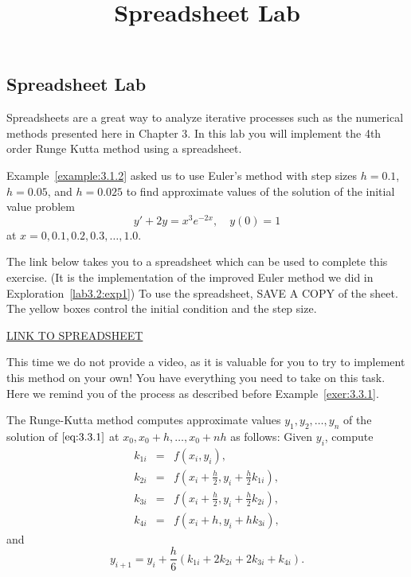 \documentclass{ximera}
\title{Spreadsheet Lab} \license{CC BY-NC-SA 4.0}
\begin{document}
\begin{abstract}
\end{abstract}
\maketitle

\begin{onlineOnly}
\section*{Spreadsheet Lab}
\end{onlineOnly}
 
Spreadsheets are a great way to analyze iterative processes such as the numerical methods presented here in Chapter 3.  In this lab you will implement the 4th order Runge Kutta method using a spreadsheet.
 
 
\begin{exploration}\label{lab3.3:exp1}
Example~\ref{example:3.1.2} asked us to use Euler's method with step sizes $h=0.1$, $h=0.05$, and $h=0.025$ to
find approximate values of the solution of the initial value problem
$$
y'+2y=x^3e^{-2x},\quad y(0)=1
$$
at $x=0, 0.1, 0.2, 0.3, \ldots, 1.0$.
 
The link below takes you to a spreadsheet which can be used to complete this exercise.  (It is the implementation of the improved Euler method we did in Exploration~\ref{lab3.2:exp1})  To use the spreadsheet, SAVE A COPY of the sheet.  The yellow boxes control the initial condition and the step size. 
     
\href{https://docs.google.com/spreadsheets/d/1UZyfR-vJ-ALm6GqvgHudH_0z-KIjuA2OZvAzZBKa4hc/edit?usp=sharing}{LINK TO SPREADSHEET}

This time we do not provide a video, as it is valuable for you to try to implement this method on your own!  You have everything you need to take on this task.  Here we remind you of the process as described before Example~\ref{exer:3.3.1}.

The Runge-Kutta method computes approximate values
$y_1, y_2, \dots, y_n$ of the solution of $\eqref{eq:3.3.1}$
at $x_0, x_0+h, \dots, x_0+nh$ as follows: Given $y_i$,
compute
\begin{eqnarray*} k_{1i}&=&f(x_i,y_i),\\
k_{2i}&=&f\left(x_i+\frac{h}{2},y_i+\frac{h}{2}k_{1i}\right),\\
k_{3i}&=&f\left(x_i+\frac{h}{2},y_i+\frac{h}{2}k_{2i}\right),\\
k_{4i}&=&f(x_i+h,y_i+hk_{3i}),
\end{eqnarray*}
and
$$
y_{i+1}=y_i+\frac{h}{6}(k_{1i}+2k_{2i}+2k_{3i}+k_{4i}).
$$

\end{exploration}



 
 




 
\end{document}
